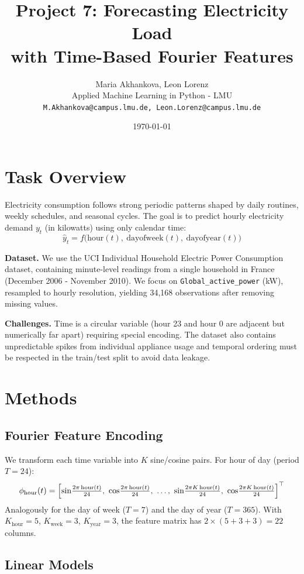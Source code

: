 \documentclass[11pt]{article}
\title{\vspace{-1.5cm}\textbf{Project 7: Forecasting Electricity Load\\
with Time-Based Fourier Features}}
\author{Maria Akhankova, Leon Lorenz \\
Applied Machine Learning in Python - LMU \\
\texttt{M.Akhankova@campus.lmu.de, Leon.Lorenz@campus.lmu.de}}
\date{\today}
\begin{document}
\maketitle
\thispagestyle{fancy}


\section{Task Overview}

Electricity consumption follows strong periodic patterns shaped by daily routines, weekly schedules, and seasonal cycles. The goal is to predict hourly electricity demand $y_t$ (in kilowatts) using only calendar time:
\[
\hat{y}_t = f\bigl(\text{hour}(t),\ \text{dayofweek}(t),\ 
\text{dayofyear}(t)\bigr)
\]

\textbf{Dataset.} We use the UCI Individual Household Electric Power Consumption dataset, containing minute-level readings from a single household in France (December 2006 - November 2010). We focus on \texttt{Global\_active\_power} (kW), resampled to hourly resolution, yielding 34{,}168 observations after removing missing values.

\textbf{Challenges.} Time is a circular variable (hour 23 and hour 0 are adjacent but numerically far apart) requiring special encoding. The dataset also contains unpredictable spikes from individual appliance usage and temporal ordering must be respected in the train/test split to avoid data leakage.


\section{Methods}


\subsection{Fourier Feature Encoding}

We transform each time variable into $K$ sine/cosine pairs. For hour of day (period $T=24$):
\[
\phi_{\text{hour}}(t) = \Bigl[
\sin\!\tfrac{2\pi\,\text{hour}(t)}{24},\
\cos\!\tfrac{2\pi\,\text{hour}(t)}{24},\
\ldots,\
\sin\!\tfrac{2\pi K\,\text{hour}(t)}{24},\
\cos\!\tfrac{2\pi K\,\text{hour}(t)}{24}
\Bigr]^\top
\]
Analogously for the day of week ($T=7$) and the day of year ($T=365$). With 
$K_{\text{hour}}=5$, $K_{\text{week}}=3$, $K_{\text{year}}=3$, the 
feature matrix has $2\times(5+3+3)=22$ columns.

\subsection{Linear Models}
\end{document}

